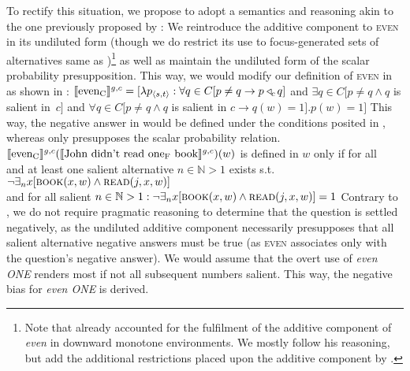 To rectify this situation, we propose to adopt a semantics and reasoning akin to the one previously proposed by \textcite{Jeong2021,Jeong2022}: We reintroduce the additive component to {\scshape even} in its undiluted form (though we do restrict its use to focus-generated sets of alternatives same as \textcite{Jeong2021,Jeong2022})\footnote{Note that \textcite{Crnic2011,Crnic2014-dogma,Crnic2014-nm} already accounted for the fulfilment of the additive component of \textit{even} in downward monotone environments. We mostly follow his reasoning, but add the additional restrictions placed upon the additive component by \textcite{Jeong2021,Jeong2022}.} as well as maintain the undiluted form of the scalar probability presupposition. This way, we would modify our definition of {\scshape even} in  as shown in :
\ex
$\intension[g,c]{even\textsubscript{C}}=[\lambda{p_{\langle s,t\rangle}}:\forall{q\in C}[p\neq q\rightarrow p\lprob\hspace{-1mm}_c\hspace{0.5mm} q]$ and $\exists{q\in C}[p\neq q\land q$ is salient in~$c]$ and $\forall{q\in C}[p\neq q\land q$ is salient in $c\rightarrow q(w)=1].p(w)=1]$
\xe
This way, the negative answer in  would be defined under the conditions posited in , whereas  only presupposes the scalar probability relation.
\ex
$\intension[g,c]{even\textsubscript{C}}(\intension[g,c]{John didn't read one\textsubscript{F} book})(w)$ is defined in $w$ only if for all\linebreak{}\\%
and at least one salient alternative $n\in\mathbb{N}>1$ exists s.t.\\%
$\neg\exists_n{x}[\predicate{book}(x,w)\land\predicate{read}(j,x,w)]$\\%
and for all salient $n\in\mathbb{N}>1:\neg\exists_n{x}[\predicate{book}(x,w)\land\predicate{read}(j,x,w)]=1$ 
\xe
Contrary to \textcite{Jeong2021,Jeong2022}, we do not require pragmatic reasoning to determine that the question is settled negatively, as the undiluted additive component necessarily presupposes that all salient alternative negative answers must be true (as {\scshape even} associates only with the question's negative answer). We would assume that the overt use of \textit{even \MakeUppercase{one}} renders most if not all subsequent numbers salient. This way, the negative bias for \textit{even \MakeUppercase{one}} is derived. 

